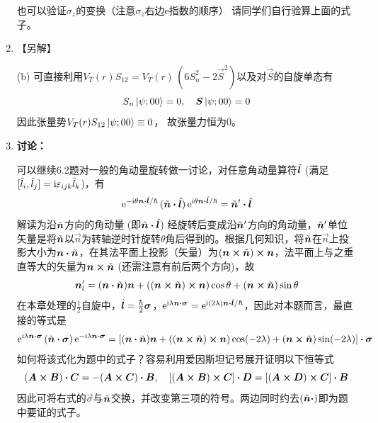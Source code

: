 \begin{enumerate}[label=\textbf{6.\arabic*}, listparindent=\parindent, leftmargin=-0.5mm]
也可以验证$\sigma_z$的变换（注意$\sigma_z$右边e指数的顺序）
请同学们自行验算上面的式子。

\setcounter{enumi}{4}
\item
【另解】

\noindent(b) 可直接利用$V_T(r)S_{12} = V_T(r)\,(6S_n^2-2\vec{S}^2)$以及对$\vec{S}$的自旋单态有
\[S_n\ket{\psi;00} = 0,\quad \vec{S}\ket{\psi;00}=0\]
因此张量势$V_T(r)S_{12}\ket{\psi;00}\equiv 0$，
故张量力恒为0。

\setcounter{enumi}{11}
\item
{\color{red}\textbf{讨论：}}

可以继续6.2题对一般的角动量旋转做一讨论，对任意角动量算符$\hl$ (满足$[\hat{l}_i,\hat{l}_j]=\im\eijk\hat{l}_k$)，有
\[\ee{-\im\theta \vec{n\cdot }\hat{\vec{l}}/\hbar}\,(\vnt\vec{\cdot}\hl)\,\ee{\im\theta \vec{n\cdot}\hat{\vec{l}}/\hbar} = \vnt'\vec{\cdot}\hl\]
解读为沿$\vnt$方向的角动量 (即$\vnt\vec{\cdot}\hl$) 经旋转后变成沿$\vnt'$方向的角动量，$\vnt'$单位矢量是将$\vnt$以$\vec{n}$为转轴逆时针旋转$\theta$角后得到的。根据几何知识，将$\vnt$在$\vec{n}$上投影大小为$\vn\vec{\cdot}\vnt$，在其法平面上投影（矢量）为$(\vn\vec{\times}\vnt)\vec{\times}\vn$，法平面上与之垂直等大的矢量为$\vn\vec{\times}\vnt$ (还需注意有前后两个方向)，故
\[\vn_l'=(\vn\vec{\cdot}\vnt)\vn+\qty((\vn\vec{\times}\vnt)\vec{\times}\vn)\cos\theta + (\vn\vec{\times}\vnt)\sin\theta\]
在本章处理的$\frac{1}{2}$自旋中，$\hl=\frac{\hbar}{2}\vec{\sigma}$，$\ee{\im\lambda\vec{n\cdot\sigma}} = \ee{\im(2\lambda)\vec{n\cdot }\hl/\hbar}$，因此对本题而言，最直接的等式是
\[\ee{\im\lambda \vec{n\cdot\sigma}}\,(\vnt\vec{\cdot\sigma})\,\ee{-\im\lambda \vec{n\cdot\sigma}} = \qty[(\vn\vec{\cdot}\vnt)\vn+\qty((\vn\vec{\times}\vnt)\vec{\times}\vn)\cos(-2\lambda) + (\vn\vec{\times}\vnt)\sin(-2\lambda)]\vec{\cdot \sigma}\]
如何将该式化为题中的式子？容易利用爱因斯坦记号展开证明以下恒等式
\[(\vA\btimes\vB)\bcdot\vC = -(\vA\btimes\vC)\bcdot\vB,\quad\qty[(\vA\btimes\vB)\btimes\vC]\bcdot\vD = \qty[(\vA\btimes\vD)\btimes\vC]\bcdot\vB\]
因此可将右式的$\vec{\sigma}$与$\vnt$交换，并改变第三项的符号。两边同时约去$(\vnt\bcdot)$即为题中要证的式子。


\end{enumerate}
